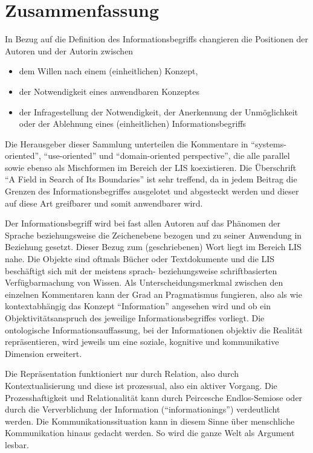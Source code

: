 \documentclass[a4paper,
fontsize=11pt,
oneside,
numbers=noperiodatend,
parskip=half-,
bibliography=totoc,
final
]{scrartcl}
\begin{document}
\section*{Zusammenfassung}\label{zusammenfassung}

In Bezug auf die Definition des Informationsbegriffs changieren die
Positionen der Autoren und der Autorin zwischen

\begin{itemize}
\item
  dem Willen nach einem (einheitlichen) Konzept,
\item
  der Notwendigkeit eines anwendbaren Konzeptes
\item
  der Infragestellung der Notwendigkeit, der Anerkennung der
  Unmöglichkeit oder der Ablehnung eines (einheitlichen)
  Informationsbegriffs
\end{itemize}

Die Herausgeber dieser Sammlung unterteilen die Kommentare in
\enquote{systems-oriented}, \enquote{use-oriented} und
\enquote{domain-oriented perspective}, die alle parallel sowie ebenso
als Mischformen im Bereich der LIS koexistieren. Die Überschrift
\enquote{A Field in Search of Its Boundaries} ist sehr treffend, da in
jedem Beitrag die Grenzen des Informationsbegriffes ausgelotet und
abgesteckt werden und dieser auf diese Art greifbarer und somit
anwendbarer wird.

Der Informationsbegriff wird bei fast allen Autoren auf das Phänomen der
Sprache beziehungsweise die Zeichenebene bezogen und zu seiner Anwendung
in Beziehung gesetzt. Dieser Bezug zum (geschriebenen) Wort liegt im
Bereich LIS nahe. Die Objekte sind oftmals Bücher oder Textdokumente und
die LIS beschäftigt sich mit der meistens sprach- beziehungsweise
schriftbasierten Verfügbarmachung von Wissen. Als Unterscheidungsmerkmal
zwischen den einzelnen Kommentaren kann der Grad an Pragmatismus
fungieren, also als wie kontextabhängig das Konzept
\enquote{Information} angesehen wird und ob ein Objektivitätsanspruch
des jeweilige Informationsbegriffes vorliegt. Die ontologische
Informationsauffassung, bei der Informationen objektiv die Realität
repräsentieren, wird jeweils um eine soziale, kognitive und
kommunikative Dimension erweitert.

Die Repräsentation funktioniert nur durch Relation, also durch
Kontextualisierung und diese ist prozessual, also ein aktiver Vorgang.
Die Prozesshaftigkeit und Relationalität kann durch Peircesche
Endlos-Semiose oder durch die Ververblichung der Information
(\enquote{informationings}) verdeutlicht werden. Die
Kommunikationssituation kann in diesem Sinne über menschliche
Kommunikation hinaus gedacht werden. So wird die ganze Welt als Argument
lesbar.
\end{document}
